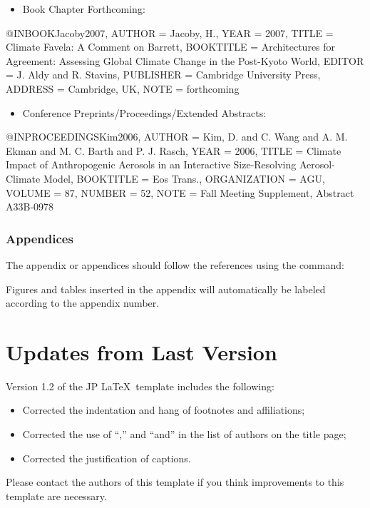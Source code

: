\documentclass[12pt,fleqn]{article}
\let\oldverbatim\verbatim
\let\oldendverbatim\endverbatim
\renewenvironment{verbatim}{\endgraf\footnotesize\singlespace\oldverbatim}{\oldendverbatim\endsinglespace}
\begin{document}
\begin{itemize}
\item Book Chapter Forthcoming:
\end{itemize}
\begin{verbatim}
@INBOOK{Jacoby2007,
  AUTHOR = {Jacoby, H.},
  YEAR = {2007},
  TITLE = {Climate Favela: A Comment on Barrett},
  BOOKTITLE = {Architectures for Agreement: Assessing Global Climate Change in
  the Post-Kyoto World},
  EDITOR = {J. Aldy and R. Stavins},
  PUBLISHER = {Cambridge University Press},
  ADDRESS = {Cambridge, UK},
  NOTE = {forthcoming}}
\end{verbatim}

\begin{itemize}
\item Conference Preprints/Proceedings/Extended Abstracts:
\end{itemize}
\begin{verbatim}
@INPROCEEDINGS{Kim2006,
  AUTHOR = {Kim, D. and C. Wang and A. M. Ekman and M. C. Barth and P. J. Rasch},
  YEAR = {2006},
  TITLE = {Climate Impact of Anthropogenic Aerosols in an Interactive
  Size-Resolving Aerosol-Climate Model},
  BOOKTITLE = {Eos Trans.},
  ORGANIZATION = {AGU},
  VOLUME = {87},
  NUMBER = {52},
  NOTE = {{F}all Meeting Supplement, Abstract A33B-0978}}
\end{verbatim}

\subsubsection{Appendices}

The appendix or appendices should follow the references using the command:
\begin{verbatim}
\appendix                             % to start the appendix portion
\appsection{}                         % if the appendix does not have a title
  % if the appendix has a title
\end{verbatim}

Figures and tables inserted in the appendix will automatically be labeled 
according to the appendix number.

\section{Updates from Last Version}

Version 1.2 of the JP \LaTeX\, template includes the following:
\begin{itemize}
  \item Corrected the indentation and hang of footnotes and affiliations;
  \item Corrected the use of ``,'' and ``and'' in the list of authors on the 
  title page;
  \item Corrected the justification of captions.
\end{itemize}
Please contact the authors of this template if you think improvements to this 
template are necessary.
\end{document}
